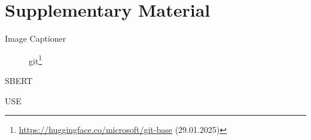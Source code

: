 \appendix
\section{Supplementary Material}

\begin{frame}{Image Captioner~\cite{git_2022}}
    \label{supp:img_cap}
    \begin{figure}
        
        \caption{\ac{git}\footnote{\url{https://huggingface.co/microsoft/git-base} (29.01.2025)}}
    \end{figure}
\end{frame}

\begin{frame}{SBERT~\cite{sbert_2019}}
    \label{supp:sbert}
    
\end{frame}

\begin{frame}{USE~\cite{use_2019}}
    \label{supp:use}
    
\end{frame}